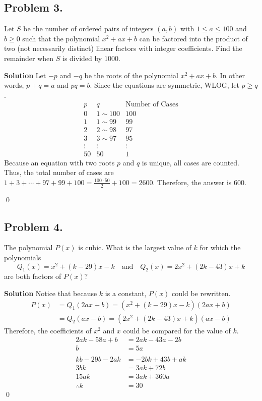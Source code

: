 \documentclass{article}
\newenvironment{solution}{\begin{trivlist}\item[]{\bf Solution}}{\qed \end{trivlist}}
\begin{document}
\subsection*{Problem 3.}
{\color {BrickRed}
Let $S$ be the number of ordered pairs of integers
$(a, b)$ with $1 \leq a \leq 100$ and $b \geq 0$ such
that the polynomial $x^2 + ax + b$ can be factored
into the product of two (not necessarily distinct)
linear factors with integer coefficients. Find the
remainder when $S$ is divided by $1000$.
}

\begin{solution}
Let $-p$ and $-q$ be the roots of the polynomial
$x^2 + ax + b$. In other words, $p + q = a$ and $pq = b$.
Since the equations are symmetric, WLOG, let $p \geq q$.
\[
\begin{array}{ccc}
    p & q & \text{Number of Cases} \\
    0 & 1 \sim 100 & 100 \\
    1 & 1 \sim 99 & 99 \\
    2 & 2 \sim 98 & 97 \\
    3 & 3 \sim 97 & 95 \\
    \vdots & \vdots & \vdots \\
    50 & 50 & 1
\end{array}
\]
Because an equation with two roots $p$ and $q$ is unique,
all cases are counted. Thus, the total number of cases
are $1 + 3 + \cdots + 97 + 99 + 100
= \frac{100 \cdot 50}{2} + 100 = 2600$. Therefore,
the answer is $\boxed{600}$.

\end{solution}

\subsection*{Problem 4.}
{\color {BrickRed}
The polynomial $P(x)$ is cubic. What is the largest value
of $k$ for which the polynomials
\[
Q_1(x) = x^2 + (k - 29)x - k \quad \text{and}
    \quad Q_2(x) = 2x^2 + (2k - 43)x + k
\]
are both factors of $P(x)$?
}

\begin{solution}
Notice that because $k$ is a constant, $P(x)$ could be rewritten.
\begin{align*}
    P(x)
    &= Q_1(2ax + b) = (x^2 + (k - 29)x - k)(2ax + b) \\
    &= Q_2(ax - b) = (2x^2 + (2k - 43)x + k)(ax - b)
\end{align*}
Therefore, the coefficients of $x^2$ and $x$ could be
compared for the value of $k$.
\begin{align*}
    2ak - 58a + b &= 2ak - 43a - 2b \\
    b &= 5a
    \\\\
    kb - 29b - 2ak &= -2bk + 43b + ak \\
    3bk &= 3ak + 72b \\
    15ak &= 3ak + 360a \\
    \therefore k &= \boxed{30}
\end{align*}
\end{solution}
\end{document}
